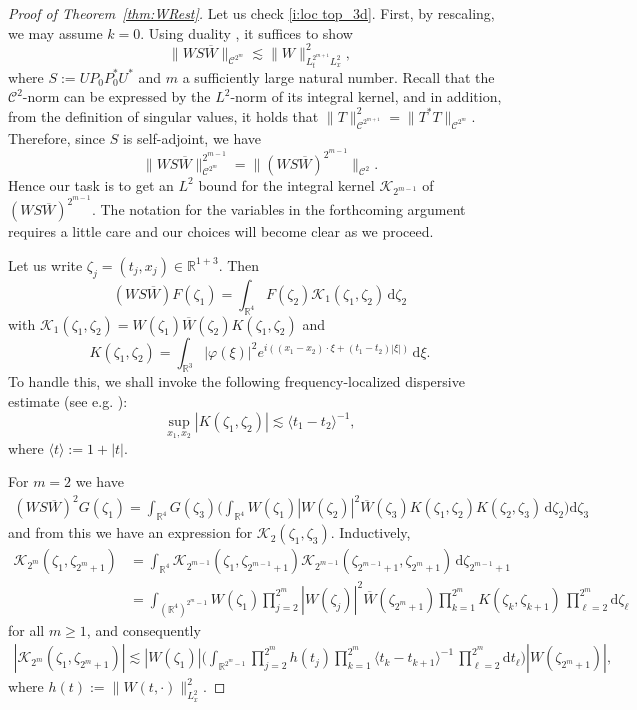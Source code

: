 \documentclass[a4paper]{amsart}
\numberwithin{equation}{section}%
\theoremstyle{plain}%
\theoremstyle{definition}
\theoremstyle{remark}%
\def\d{\mathrm{d}}
\def\C{\mathcal{C}}
\def\K{\mathcal{K}}
\def\C{\mathcal{C}}
\def\K{\mathcal{K}}
\begin{document}
\begin{proof}[Proof of Theorem~\ref{thm:WRest}]
Let us check \eqref{i:loc top_3d}. First, by rescaling, we may assume $k=0$. Using duality \cite[Lemma 3]{FS_AJM}, it suffices to show
\begin{equation}\label{est:WRest_Dual_3d2}
\|WS\overline{W}\|_{\C^{2^m}}
\lesssim 
\|W\|_{L_t^{2^{m+1}}L_x^{2}}^2,
\end{equation}
where $S:=U P_0 P_0^* U^*$ and $m$ a sufficiently large natural number. Recall that the $\C^{2}$-norm can be expressed by the $L^2$-norm of its integral kernel, and in addition, from the definition of singular values, it holds that $\| T \|_{\C^{2^{m+1}}}^2 = \| T^* T \|_{\C^{2^m}}$. 
Therefore, since $S$ is self-adjoint, we have
\[
\|WS\overline{W}\|_{\C^{2^m}}^{2^{m-1}} = \| (WS\overline{W})^{2^{m-1}}\|_{\C^{2}}.
\]
Hence our task is to get an $L^2$ bound for the integral kernel $\K_{2^{m-1}}$ of $(WS\overline{W})^{2^{m-1}}$. The notation for the variables in the forthcoming argument requires a little care and our choices will become clear as we proceed.

Let us write $\zeta_j=(t_j,x_j)\in \mathbb R^{1+3}$. Then
\[
(WS\overline{W})F(\zeta_1)
=
\int_{\mathbb R^{4}}F(\zeta_2)\K_1(\zeta_1,\zeta_2)\,\d\zeta_2
\]
with $\K_1(\zeta_1,\zeta_2)=W(\zeta_1)\overline{W}(\zeta_2)K(\zeta_1,\zeta_2)$ and 
\[
K(\zeta_1,\zeta_2)
=
\int_{\mathbb R^3}|\varphi(\xi)|^2 e^{i((x_1-x_2)\cdot\xi+(t_1-t_2)|\xi|)}\,\d\xi.
\]
To handle this, we shall invoke the following frequency-localized dispersive estimate (see e.g. \cite{GPW}):
\begin{equation}
\label{e:dispersive_W_local}
    \sup_{x_1,x_2} |K(\zeta_1,\zeta_2)| \lesssim \langle t_1-t_2 \rangle^{-1},
\end{equation}
where $\langle t \rangle := 1 + |t|$.

For $m = 2$ we have
\begin{align*}
(WS\overline{W})^2 G(\zeta_1)
=
\int_{\mathbb R^{4}}G(\zeta_3)\Big(\int_{\mathbb R^{4}}W(\zeta_1)|W(\zeta_2)|^2\overline{W}(\zeta_3)K(\zeta_1,\zeta_2)K(\zeta_2,\zeta_3)\,\d\zeta_2\Big)\d\zeta_3
\end{align*}
and from this we have an expression for $\K_2(\zeta_1,\zeta_3)$. Inductively, 
\begin{align*}
\K_{2^{m}}(\zeta_1,\zeta_{2^{m}+1})
&=
\int_{\mathbb R^{4}}\K_{2^{m-1}}(\zeta_1,\zeta_{2^{m-1}+1})\K_{2^{m-1}}(\zeta_{2^{m-1}+1},\zeta_{2^{m}+1})\,\d\zeta_{2^{m-1}+1}\\
&=
\int_{(\mathbb R^{4})^{2^m-1}}W(\zeta_1)\prod_{j=2}^{2^m}|W(\zeta_j)|^2\overline{W}(\zeta_{2^m+1})
\prod_{k=1}^{2^m}K(\zeta_k,\zeta_{k+1})\, \prod_{\ell = 2}^{2^m} \d\zeta_\ell
\end{align*}
for all $m \geq 1$, and consequently
\begin{align*}
|\K_{2^{m}}(\zeta_1,\zeta_{2^{m}+1})| \lesssim |W(\zeta_1)| \bigg( \int_{\mathbb R^{2^m-1}} \prod_{j=2}^{2^m} h(t_j)  \prod_{k=1}^{2^m} \langle t_k-t_{k + 1} \rangle^{-1} \, \prod_{\ell = 2}^{2^m} \d t_\ell \bigg) |W(\zeta_{2^m+1})|,
\end{align*}
where $h(t) := \| W(t,\cdot)\|_{L^2_x}^2$.


\end{proof}
\end{document}
